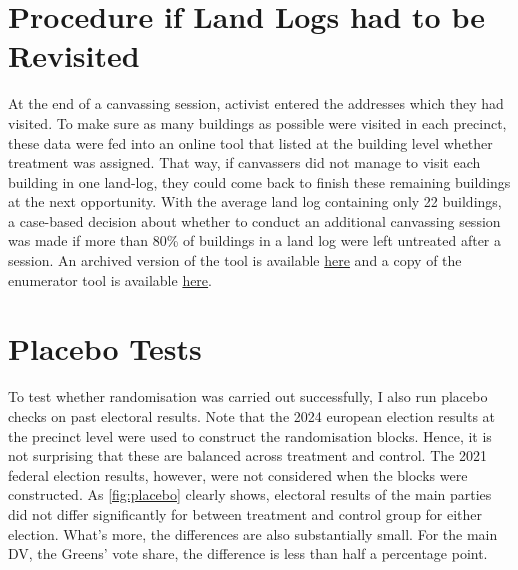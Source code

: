 \documentclass[11pt,a4paper]{scrartcl}
\begin{document}
\newpage
\begin{appendices}

	\begin{refsection}


		\section{Procedure if Land Logs had to be Revisited}\label{sec:revisit}
		At the end of a canvassing session, activist entered the addresses which they had visited. To make sure as many buildings as possible were visited in each precinct, these data were fed into an online tool that listed at the building level whether treatment was assigned. That way, if canvassers did not manage to visit each building in one land-log, they could come back to finish these remaining buildings at the next opportunity. With the average land log containing only 22 buildings, a case-based decision  about whether to conduct an additional canvassing session was made if  more than 80\% of buildings in a land log were left untreated after a session.  An archived version of the tool is available
		\href{https://antonkoenneke.de/_files/papers/2025/berlin_listening_rct/supplementary_documents/maptool.html}{here}  and a copy of the enumerator tool is available \href{https://lse.eu.qualtrics.com/jfe/form/SV_6RNRl2SydAy4ORo?distribution=ReplicationMaterial}{here}.

		\section{Placebo Tests}\label{sec:placebo}

		To test whether randomisation was carried out successfully, I also run placebo checks on past electoral results. Note that the 2024 european election results at the precinct level were used to construct the randomisation blocks. Hence, it is not surprising that these are balanced across treatment and control. The 2021 federal election results, however, were not considered when the blocks were constructed. As \autoref{fig:placebo} clearly shows, electoral results of the main parties did not differ significantly for between treatment and control group for either election. What's more, the differences are also substantially small. For the main DV, the Greens' vote share, the difference is less than half a percentage point.


\end{refsection}
\end{appendices}
\end{document}
